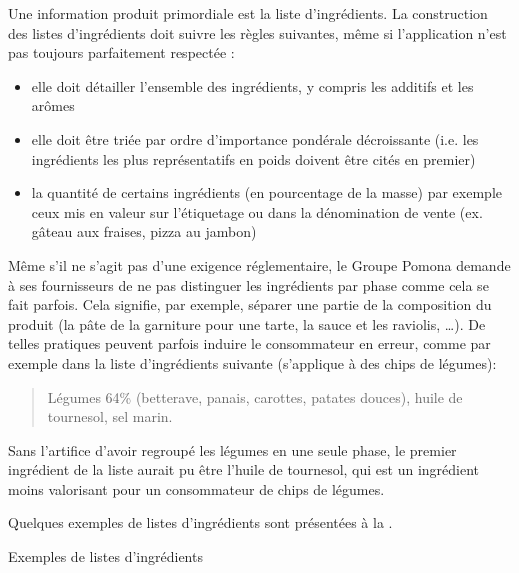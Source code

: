         Une information produit primordiale est la liste d'ingrédients.
        La construction des listes d'ingrédients doit suivre les règles suivantes, même si l'application n'est pas toujours parfaitement respectée :
        \begin{itemize}
            \item elle doit détailler l'ensemble des ingrédients, y compris les additifs et les arômes
            \item elle doit être triée par ordre d'importance pondérale décroissante (i.e. les ingrédients les plus représentatifs en poids doivent être cités en premier)
            \item la quantité de certains ingrédients (en pourcentage de la masse) par exemple ceux mis en valeur sur l'étiquetage ou dans la dénomination de vente (ex. gâteau aux fraises, pizza au jambon)
        \end{itemize}
        Même s'il ne s'agit pas d'une exigence réglementaire, le Groupe Pomona demande à ses fournisseurs de ne pas distinguer les ingrédients par phase comme cela se fait parfois.
        Cela signifie, par exemple, séparer une partie de la composition du produit (la pâte de la garniture pour une tarte, la sauce et les raviolis, \dots).
        De telles pratiques peuvent parfois induire le consommateur en erreur, comme par exemple dans la liste d'ingrédients suivante (s'applique à des chips de légumes):
        \begin{quotation}
            Légumes 64\% (betterave, panais, carottes, patates douces), huile de tournesol, sel marin.
        \end{quotation}
        Sans l'artifice d'avoir regroupé les légumes en une seule phase, le premier ingrédient de la liste aurait pu être l'huile de tournesol, qui est un ingrédient moins valorisant pour un consommateur de chips de légumes.

        Quelques exemples de listes d'ingrédients sont présentées à la .

        {\renewcommand{\arraystretch}{2}%
        \begin{table}[htbp]
            {\scriptsize
            \begin{center}%
            \caption{Exemples de listes d'ingrédients}%
            \label{tbl:exemple_ingred}%
            \end{center}%
            }
        \end{table}
        }

